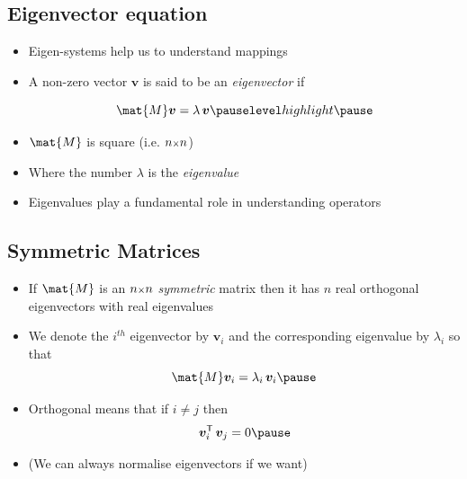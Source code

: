 \begin{slide}
\section[-2]{Eigenvector equation}
\pb

  \begin{itemize}
  \item Eigen-systems help us to understand mappings\pauseh
  \item A non-zero vector $\bm{v}$ is said to be an \emph{eigenvector} if
    \begin{minipage}{0.5\linewidth}
      \begin{displaymath}
        \mat{M} \bm{v} = \lambda \, \bm{v}\pauseh
      \end{displaymath}
    \end{minipage}\hfill
    \begin{minipage}{0.4\linewidth}
      \pause
    \end{minipage}
  \item $\mat{M}$ is square (i.e. $n{\scriptstyle \times} n$)\pauseh
  \item Where the number $\lambda$ is the \emph{eigenvalue}\pauseh
  \item Eigenvalues play a fundamental role in understanding operators\pauseh
  \end{itemize}


\end{slide}



\begin{slide}
\section[-1]{Symmetric Matrices}

\begin{PauseHighLight}
  \begin{itemize}
  \item If $\mat{M}$ is an $n{\scriptstyle \times} n$ \emph{symmetric} matrix then it has
    $n$ real orthogonal eigenvectors with real eigenvalues\pause
  \item We denote the $i^{th}$ eigenvector by $\bm{v}_i$ and the
    corresponding eigenvalue by $\lambda_i$ so that
    \begin{displaymath}
      \mat{M} \bm{v}_i = \lambda_i \, \bm{v}_i \pause
    \end{displaymath}
  \item Orthogonal means that if $i\neq j$ then
    \begin{displaymath}
      \bm{v}_i^\tr \, \bm{v}_j = 0\pause
  \end{displaymath}
  \item (We can always normalise eigenvectors if we want)\pause
  \end{itemize}
\end{PauseHighLight}

\end{slide}



